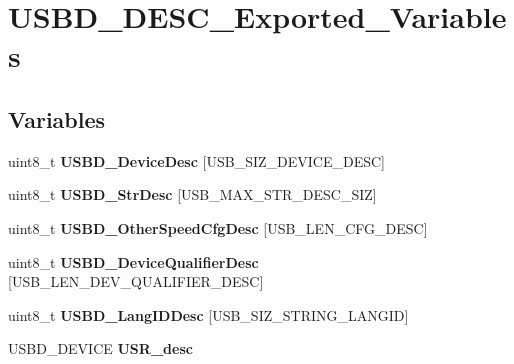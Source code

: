 \hypertarget{group__USBD__DESC__Exported__Variables}{\section{U\-S\-B\-D\-\_\-\-D\-E\-S\-C\-\_\-\-Exported\-\_\-\-Variables}
\label{group__USBD__DESC__Exported__Variables}
}
\subsection*{Variables}
\begin{DoxyCompactItemize}
\item 
\hypertarget{group__USBD__DESC__Exported__Variables_ga94c3f26693cf94753af869c7b8b557d0}{uint8\-\_\-t {\bfseries U\-S\-B\-D\-\_\-\-Device\-Desc} \mbox{[}U\-S\-B\-\_\-\-S\-I\-Z\-\_\-\-D\-E\-V\-I\-C\-E\-\_\-\-D\-E\-S\-C\mbox{]}}\label{group__USBD__DESC__Exported__Variables_ga94c3f26693cf94753af869c7b8b557d0}

\item 
\hypertarget{group__USBD__DESC__Exported__Variables_ga5f90f5553b6142813724f23dbc2657a6}{uint8\-\_\-t {\bfseries U\-S\-B\-D\-\_\-\-Str\-Desc} \mbox{[}U\-S\-B\-\_\-\-M\-A\-X\-\_\-\-S\-T\-R\-\_\-\-D\-E\-S\-C\-\_\-\-S\-I\-Z\mbox{]}}\label{group__USBD__DESC__Exported__Variables_ga5f90f5553b6142813724f23dbc2657a6}

\item 
\hypertarget{group__USBD__DESC__Exported__Variables_ga6f88a850f123e94ed71e4fd30cf83b12}{uint8\-\_\-t {\bfseries U\-S\-B\-D\-\_\-\-Other\-Speed\-Cfg\-Desc} \mbox{[}U\-S\-B\-\_\-\-L\-E\-N\-\_\-\-C\-F\-G\-\_\-\-D\-E\-S\-C\mbox{]}}\label{group__USBD__DESC__Exported__Variables_ga6f88a850f123e94ed71e4fd30cf83b12}

\item 
uint8\-\_\-t {\bfseries U\-S\-B\-D\-\_\-\-Device\-Qualifier\-Desc} \mbox{[}U\-S\-B\-\_\-\-L\-E\-N\-\_\-\-D\-E\-V\-\_\-\-Q\-U\-A\-L\-I\-F\-I\-E\-R\-\_\-\-D\-E\-S\-C\mbox{]}
\item 
uint8\-\_\-t {\bfseries U\-S\-B\-D\-\_\-\-Lang\-I\-D\-Desc} \mbox{[}U\-S\-B\-\_\-\-S\-I\-Z\-\_\-\-S\-T\-R\-I\-N\-G\-\_\-\-L\-A\-N\-G\-I\-D\mbox{]}
\item 
\hypertarget{group__USBD__DESC__Exported__Variables_ga7b6c0e09bf9f913c610ff42bad814488}{U\-S\-B\-D\-\_\-\-D\-E\-V\-I\-C\-E {\bfseries U\-S\-R\-\_\-desc}}\label{group__USBD__DESC__Exported__Variables_ga7b6c0e09bf9f913c610ff42bad814488}

\end{DoxyCompactItemize}


